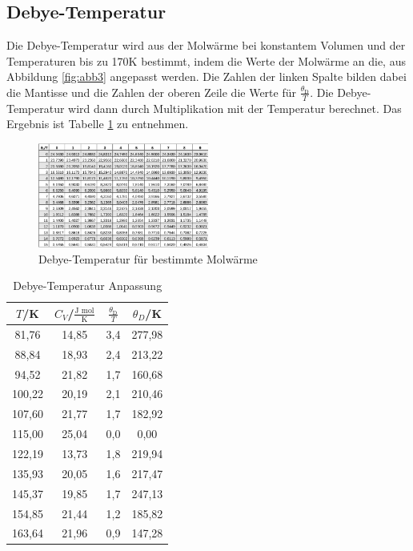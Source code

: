 \subsection{Debye-Temperatur}
Die Debye-Temperatur wird aus der Molwärme bei konstantem Volumen und der Temperaturen bis zu 170K bestimmt, indem die Werte der Molwärme an die, aus Abbildung \ref{fig:abb3} angepasst werden. Die Zahlen der linken Spalte bilden dabei die Mantisse und die Zahlen der oberen Zeile die Werte für \(\frac{\theta_\text{D}}{T}\). Die Debye-Temperatur wird dann durch Multiplikation mit der Temperatur berechnet. Das Ergebnis ist Tabelle \ref{fig:tab4} zu entnehmen.

\begin{figure}
	\centering
		\includegraphics[width=0.5\textwidth]{debye.png}
	\caption{Debye-Temperatur für bestimmte Molwärme}
	\label{fig:abb2}
\end{figure}

\begin{table}[H]
	\begin{center}
		\begin{tabular}{c c c c}
			\toprule
			\(T\)/K & \(C_V\)/\(\frac{\text{J mol}}{\text{K}}\) & \(\frac{\theta_\text{D}}{T}\) & \(\theta_D\)/K \\
			\midrule
			81,76	&14,85	&3,4		&277,98\\
			88,84	&18,93	&2,4		&213,22\\
			94,52	&21,82	&1,7		&160,68\\
			100,22	&20,19	&2,1		&210,46\\
			107,60	&21,77	&1,7		&182,92\\
			115,00	&25,04	&0,0		&0,00\\
			122,19	&13,73	&1,8		&219,94\\
			135,93	&20,05	&1,6		&217,47\\
			145,37	&19,85	&1,7		&247,13\\
			154,85	&21,44	&1,2		&185,82\\
			163,64	&21,96	&0,9		&147,28\\
			\bottomrule
		\end{tabular}
		\caption{Debye-Temperatur Anpassung}
		\label{fig:tab4}
	\end{center}
\end{table}

